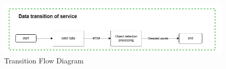 \begin{figure}[ht]
  \begin{center}
  \includegraphics[scale=0.6]{resources/TransitionFlow.png}
  \end{center}
  \caption[Transition Flow Diagram]{Transition Flow Diagram}
  \label{fig:transition flow design}
\end{figure}

